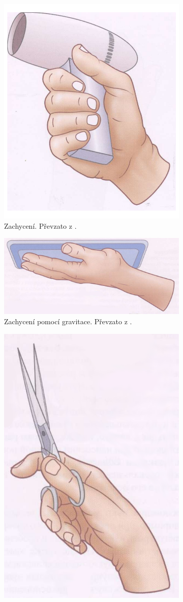 \documentclass[thesis=B,czech]{FITthesis}[2012/06/26]
\begin{document}
 \begin{figure}[H]
\centering
\begin{subfigure}{.3\textwidth}
  \centering
  \includegraphics[width=.6\linewidth]{./image/simplGrip.png}
  \caption{Zachycení. Převzato z \cite{PhysJoin}.}
  \label{fig:simplGrip}
\end{subfigure}
\begin{subfigure}{.5\textwidth}
  \centering
  \includegraphics[width=.7\linewidth]{./image/gravGrip.png}
  \caption{Zachycení pomocí gravitace. Převzato z \cite{PhysJoin}.}
  \label{fig:gravGrip}
\end{subfigure}
\label{fig:test}
\begin{subfigure}{.3\textwidth}
  \centering
  \includegraphics[width=.6\linewidth]{./image/actionGrip.png}

\end{subfigure}
\end{figure}
\end{document}
